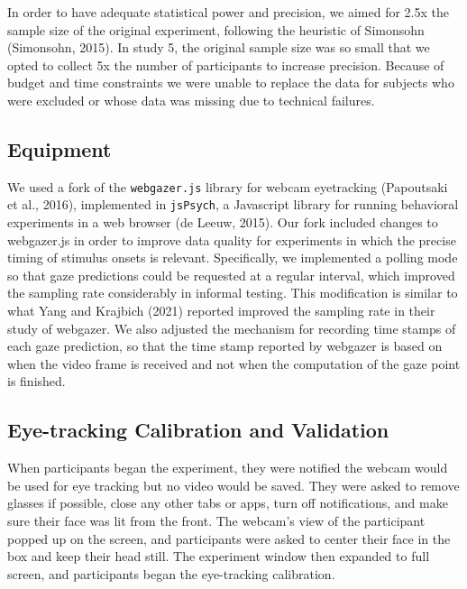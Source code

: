 \documentclass[
  man,floatsintext]{apa6}
\begin{document}
In order to have adequate statistical power and precision, we aimed for
2.5x the sample size of the original experiment, following the heuristic
of Simonsohn (Simonsohn, 2015). In study 5, the original sample size was so
small that we opted to collect 5x the number of participants to increase
precision. Because of budget and time constraints we were unable to
replace the data for subjects who were excluded or whose data was
missing due to technical failures.

\hypertarget{equipment}{%
\subsection{Equipment}\label{equipment}}

We used a fork of the \texttt{webgazer.js} library for webcam eyetracking
(Papoutsaki et al., 2016), implemented in \texttt{jsPsych}, a Javascript
library for running behavioral experiments in a web browser
(de Leeuw, 2015). Our fork included changes to
webgazer.js in order to improve data quality for experiments in which
the precise timing of stimulus onsets is relevant. Specifically, we
implemented a polling mode so that gaze predictions could be requested
at a regular interval, which improved the sampling rate considerably in
informal testing. This modification is similar to what Yang and Krajbich
(2021) reported improved the sampling rate in their study of
webgazer. We also adjusted the mechanism for recording time stamps of
each gaze prediction, so that the time stamp reported by webgazer is
based on when the video frame is received and not when the computation
of the gaze point is finished.

\hypertarget{eye-tracking-calibration-and-validation}{%
\subsection{Eye-tracking Calibration and Validation}\label{eye-tracking-calibration-and-validation}}

When participants began the experiment, they were notified the webcam
would be used for eye tracking but no video would be saved. They were
asked to remove glasses if possible, close any other tabs or apps, turn
off notifications, and make sure their face was lit from the front. The
webcam's view of the participant popped up on the screen, and
participants were asked to center their face in the box and keep their
head still. The experiment window then expanded to full screen, and
participants began the eye-tracking calibration.
\end{document}
